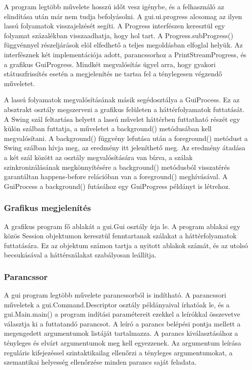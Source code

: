 A program legtöbb művelete hosszú időt vesz igénybe, és a felhasználó az elindítása után már nem tudja befolyásolni.
A gui.ui.progress alcsomag az ilyen lassú folyamatok visszajelzését segíti.
A Progress interfészen keresztül egy folyamat százalékban visszaadhatja, hogy hol tart.
A Progress.subProgress() függvénnyel részeljárások elöl elfedhető a teljes megoldásban elfoglal helyük.
Az interfésznek két implementációja adott, parancssorhoz a PrintStreamProgress, és a grafikus GuiProgress.
Mindkét megvalósítás ügyel arra, hogy gyakori státuszfrissítés esetén a megjelenítés ne tartsa fel a ténylegesen végzendő műveletet.

A lassú folyamatok megvalósításának másik segédosztálya a GuiProcess.
Ez az absztrakt osztály megszervezi a grafikus felületen a háttérfolyamatok futtatását.
A Swing szál feltartása helyett a lassú művelet háttérben futtatható részét egy külön szálban futtatja, a műveletet a background() metódusában kell megvalósítani.
A background() függvény lefutása után a foreground() metódust a Swing szálban hívja meg, az eredmény itt jeleníthető meg. Az eredmény átadása a két szál között az osztály megvalósítására van bízva, a szálak szinkronizálásának megkönnyítésére a background() metódusból visszatérés garantáltan happens-before relációban van a foreground() meghívásával.
A GuiProcess a background() futásához egy GuiProgress példányt is létrehoz.

\subsubsection{Grafikus megjelenítés}

A grafikus program fő ablakát a gui.Gui osztály írja le.
A program ablakai egy közös Session objektumon keresztül fenntartanak szálakat a háttérfolyamatok futtatására.
Ez az objektum számon tartja a nyitott ablakok számát, és az utolsó becsukásával a háttérszálakat szabályosan leállítja.

\subsubsection{Parancssor}

A gui program legtöbb művelete parancssorból is indítható.
A parancssori műveletek a gui.Command.Descriptor osztály példányaival írhatóak le, és a gui.Main.main() a program indítási paramétereit ezekkel a leírókkal összevetve választja ki a futtatandó parancsot.
A leíró a parancs belépési pontja mellett a megengedett argumentumok listáját tartalmazza. A parancs kiválasztásához a tényleges és elvárt argumentumok meg kell egyezzenek.
Az argumentum leírása reguláris kifejezéssel szintaktikailag ellenőrzi a tényleges argumentumokat, a szemantikai helyesség ellenőrzése minden parancs saját feladata.

